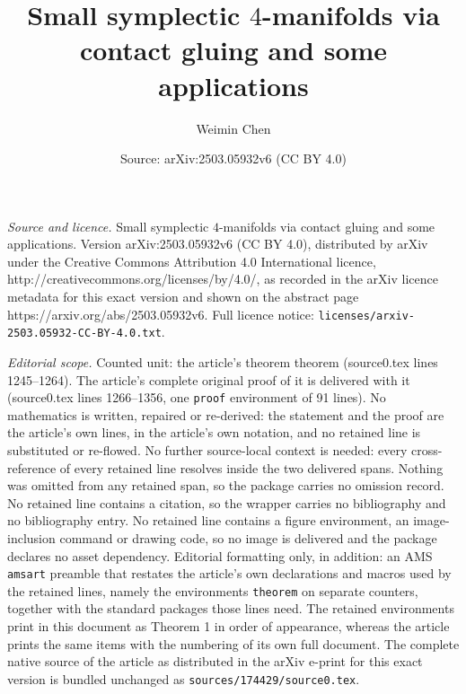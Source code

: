 \documentclass[10pt,a4paper]{amsart}
\title{Small symplectic $4$-manifolds via contact gluing and some applications}
\author{Weimin Chen}
\date{Source: arXiv:2503.05932v6 (CC BY 4.0)}
\begin{document}
\maketitle

\noindent\emph{Source and licence.} Small symplectic $4$-manifolds via contact gluing and some applications. Version arXiv:2503.05932v6 (CC BY 4.0), distributed by arXiv under the Creative Commons Attribution 4.0 International licence, http://creativecommons.org/licenses/by/4.0/, as recorded in the arXiv licence metadata for this exact version and shown on the abstract page https://arxiv.org/abs/2503.05932v6. Full licence notice: \texttt{licenses/arxiv-2503.05932-CC-BY-4.0.txt}.\par\smallskip

\noindent\textit{Editorial scope.} Counted unit: the article's theorem theorem (source0.tex lines 1245--1264). The article's complete original proof of it is delivered with it (source0.tex lines 1266--1356, one \texttt{proof} environment of 91 lines). No mathematics is written, repaired or re-derived: the statement and the proof are the article's own lines, in the article's own notation, and no retained line is substituted or re-flowed.  No further source-local context is needed: every cross-reference of every retained line resolves inside the two delivered spans.  Nothing was omitted from any retained span, so the package carries no omission record.  No retained line contains a citation, so the wrapper carries no bibliography and no bibliography entry.  No retained line contains a figure environment, an image-inclusion command or drawing code, so no image is delivered and the package declares no asset dependency.  Editorial formatting only, in addition: an AMS \texttt{amsart} preamble that restates the article's own declarations and macros used by the retained lines, namely the environments \texttt{theorem} on separate counters, together with the standard packages those lines need.  The retained environments print in this document as Theorem 1 in order of appearance, whereas the article prints the same items with the numbering of its own full document.  The complete native source of the article as distributed in the arXiv e-print for this exact version is bundled unchanged as \texttt{sources/174429/source0.tex}.
\end{document}
